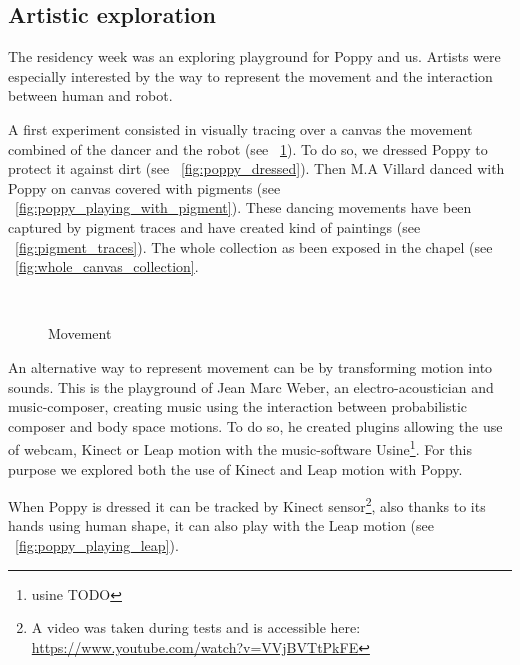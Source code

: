 \subsection{Artistic exploration} %

The residency week was an exploring playground for Poppy and us. Artists were especially interested by the way to represent the movement and the interaction between human and robot.

A first experiment consisted in visually tracing over a canvas the movement combined of the dancer and the robot (see \figurename~\ref{fig:residency_canvas}). To do so, we dressed Poppy to protect it against dirt (see \figurename~\ref{fig:poppy_dressed}). Then M.A Villard danced with Poppy on canvas covered with pigments (see \figurename~\ref{fig:poppy_playing_with_pigment}). These dancing movements have been captured by pigment traces and have created kind of paintings (see \figurename~\ref{fig:pigment_traces}). The whole collection as been exposed in the chapel (see \figurename~\ref{fig:whole_canvas_collection}.

\begin{figure}[tb]
\centering
    \hfil
    \\
    \hfil
    \caption{Movement }
    \label{fig:residency_canvas}
\end{figure}

An alternative way to represent movement can be by transforming motion into sounds. This is the playground of Jean Marc Weber, an electro-acoustician and music-composer, creating music using the interaction between probabilistic composer and body space motions. To do so, he created plugins allowing the use of webcam, Kinect or Leap motion with the music-software Usine\footnote{usine TODO}. For this purpose we explored both the use of Kinect and Leap motion with Poppy.

When Poppy is dressed it can be tracked by Kinect sensor\footnote{A video was taken during tests and is accessible here: \url{https://www.youtube.com/watch?v=VVjBVTtPkFE}}, also thanks to its hands using human shape, it can also play with the Leap motion (see \figurename~\ref{fig:poppy_playing_leap}).

